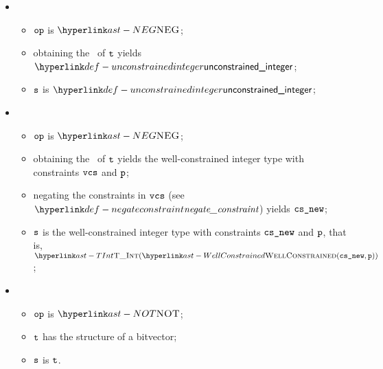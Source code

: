 \begin{itemize}
\item {}
\begin{itemize}
  \item $\op$ is $\NEG$;
  \item obtaining the \wellconstrainedstructure\ of $\vt$ yields $\unconstrainedinteger$\ProseOrTypeError;
  \item $\vs$ is $\unconstrainedinteger$;
\end{itemize}

\item {}
\begin{itemize}
  \item $\op$ is $\NEG$;
  \item obtaining the \wellconstrainedstructure\ of $\vt$ yields the well-constrained integer type with constraints $\vcs$ and \Proseprecisionlossindicator{} $\vp$\ProseOrTypeError;
  \item negating the constraints in $\vcs$ (see $\negateconstraint$) yields $\vcsnew$;
  \item $\vs$ is the well-constrained integer type with constraints $\vcsnew$ and \Proseprecisionlossindicator{} $\vp$, that is, \\
  $\TInt(\WellConstrained(\vcsnew, \vp))$;
\end{itemize}

\item {}
  \begin{itemize}
  \item $\op$ is $\NOT$;
  \item $\vt$ has the structure of a bitvector;
  \item $\vs$ is $\vt$.
  \end{itemize}
\end{itemize}

\FormallyParagraph
\begin{mathpar}
\end{mathpar}

\begin{mathpar}
\end{mathpar}

